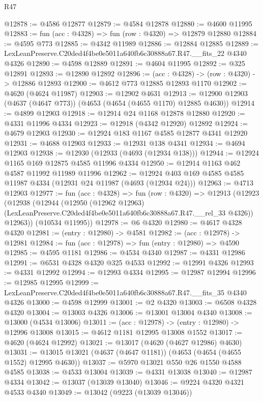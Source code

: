 \begin{lexlean}{R47}
\begin{coremodule}
@12878 := @4586 @12877
@12879 := @4584 @12878
@12880 := @4600 @11995
@12883 := fun (acc : @4328) => fun (row : @4320) => @12879 @12880
@12884 := @4595 @773
@12885 := @4342 @11989
@12886 := @12884 @12885
@12889 := LexLeanPreserve.C20ded4f4be0e5011a640fb6c30888a67.R47.__fits_22 @4340 @4326
@12890 := @4598 @12889
@12891 := @4604 @11995
@12892 := @325 @12891
@12893 := @12890 @12892
@12896 := (acc : @4328) -> (row : @4320) -> @12886 @12893
@12900 := @4612 @773 @12885 @12893 @1170
@12902 := @4620 (@4624 @11987)
@12903 := @12902 @4631
@12913 := @12900 @12903 (@4637 (@4647 @773)) (@4653 (@4654 (@4655 @1170) @12885 @4630))
@12914 := @4899 @12903
@12918 := @12914 @24 @1168 @12878 @12880
@12920 := @4331 @11996 @4334
@12923 := @12918 (@4342 @12920) @12892
@12924 := @4679 @12903
@12930 := @12924 @183 @1167 @4585 @12877 @4341 @12920
@12931 := @4688 @12903
@12933 := @12931 @138 @4341
@12934 := @4694 @12903
@12938 := @12930 (@12933 (@4693 (@12934 @138)))
@12944 := @12924 @1165 @169 @12875 @4585 @11996 @4334
@12950 := @12914 @1163 @462 @4587 @11992 @11989 @11996
@12962 := @12924 @403 @169 @4585 @4585 @11987 @4334 (@12931 @24 @11987 (@4693 (@12934 @24)))
@12963 := @4713 @12903
@12977 := fun (acc : @4328) =>
  fun (row : @4320) =>
  @12913
    (@12923
      (@12938
        (@12944
          (@12950
            (@12962 @12963)
            (LexLeanPreserve.C20ded4f4be0e5011a640fb6c30888a67.R47.__rel_33 @4326))
          @12963))
      (@10534 @11995))
@12978 := @6 @4320
@12980 := @4617 @4328 @4320
@12981 := (entry : @12980) -> @4581
@12982 := (acc : @12978) -> @12981
@12984 := fun (acc : @12978) => fun (entry : @12980) => @4590
@12985 := @4595 @1181
@12986 := @4534 @4340
@12987 := @4331 @12986
@12991 := @6531 @4328 @4320 @325 @4533
@12992 := @12991 @4326
@12993 := @4331 @12992
@12994 := @12993 @4334
@12995 := @12987 @12994
@12996 := @12985 @12995
@12999 := LexLeanPreserve.C20ded4f4be0e5011a640fb6c30888a67.R47.__fits_35 @4340 @4326
@13000 := @4598 @12999
@13001 := @2 @4320
@13003 := @6508 @4328 @4320
@13004 := @13003 @4326
@13006 := @13001 @13004 @4340
@13008 := @13000 (@4534 @13006)
@13011 := (acc : @12978) -> (entry : @12980) -> @12996 @13008
@13015 := @4612 @1181 @12995 @13008 @1552
@13017 := @4620 (@4624 @12992)
@13021 := @13017 (@4620 (@4627 @12986) @4630)
@13031 := @13015 @13021 (@4637 (@4647 @1181)) (@4653 (@4654 (@4655 @1552) @12995 @4630))
@13037 := @5970 @13021 @550 @26 @1550 @4588 @4585
@13038 := @4533 @13004
@13039 := @4331 @13038
@13040 := @12987 @4334
@13042 := @13037 (@13039 @13040)
@13046 := @9224 @4320 @4321 @4533 @4340
@13049 := @13042 (@9223 (@13039 @13046))

\end{coremodule}
\end{lexlean}
